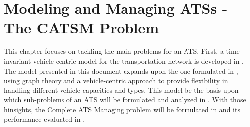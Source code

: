 \chapter{Modeling and Managing ATSs - The CATSM Problem}\label{ch:tim_ats}
This chapter focuses on tackling the main problems for an ATS. First, a time-invariant vehicle-centric model for the transportation network is developed in . The model presented in this document expands upon the one formulated in \cite{project_thesis}, using graph theory and a vehicle-centric approach to provide flexibility in handling different vehicle capacities and types. This model be the basis upon which sub-problems of an ATS will be formulated and analyzed in . With those hinsights, the Complete ATS Managing problem will be formulated in  and its performance evaluated in . 
